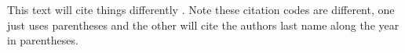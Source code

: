 \documentclass[12pt]{article}
\begin{document}
\begin{flushleft}
This text will cite things differently \cite{cary1967influence}. Note these citation codes are different, one just uses parentheses and the other will cite the authors last name along the year in parentheses. 





\clearpage
\begingroup
	\nocite{*}
	
	
	
	
	
	
	
\endgroup







\end{flushleft}
\end{document}
